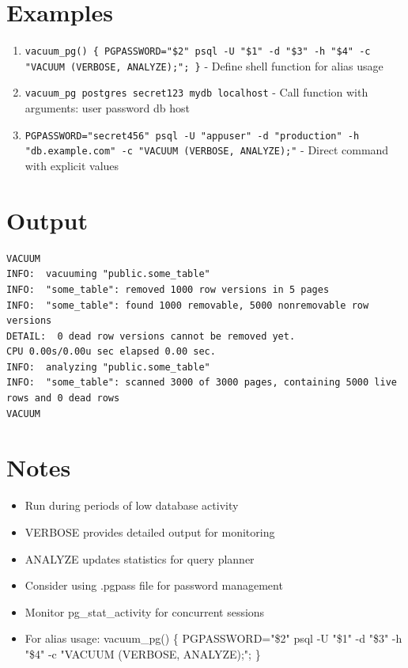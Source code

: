 \documentclass{article}
\begin{document}
\section*{Examples}
\begin{enumerate}
  \item \texttt{vacuum\_pg() \{ PGPASSWORD="\$2" psql -U "\$1" -d "\$3" -h "\$4" -c "VACUUM (VERBOSE, ANALYZE);"; \}} - Define shell function for alias usage
  \item \texttt{vacuum\_pg postgres secret123 mydb localhost} - Call function with arguments: user password db host
  \item \texttt{PGPASSWORD="secret456" psql -U "appuser" -d "production" -h "db.example.com" -c "VACUUM (VERBOSE, ANALYZE);"} - Direct command with explicit values
\end{enumerate}

\section*{Output}
\begin{lstlisting}
VACUUM
INFO:  vacuuming "public.some_table"
INFO:  "some_table": removed 1000 row versions in 5 pages
INFO:  "some_table": found 1000 removable, 5000 nonremovable row versions
DETAIL:  0 dead row versions cannot be removed yet.
CPU 0.00s/0.00u sec elapsed 0.00 sec.
INFO:  analyzing "public.some_table"
INFO:  "some_table": scanned 3000 of 3000 pages, containing 5000 live rows and 0 dead rows
VACUUM
\end{lstlisting}

\section*{Notes}
\begin{itemize}
  \item Run during periods of low database activity
  \item VERBOSE provides detailed output for monitoring
  \item ANALYZE updates statistics for query planner
  \item Consider using .pgpass file for password management
  \item Monitor pg\_stat\_activity for concurrent sessions
  \item For alias usage: vacuum\_pg() \{ PGPASSWORD="\$2" psql -U "\$1" -d "\$3" -h "\$4" -c "VACUUM (VERBOSE, ANALYZE);"; \}
\end{itemize}
\end{document}
